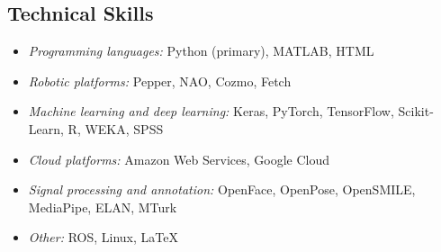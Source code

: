 \documentclass[11pt,letterpaper]{article}
\begin{document}
\subsection*{Technical Skills}
\begin{itemize}
  \item \emph{Programming languages:} Python (primary), MATLAB, HTML
  \item \emph{Robotic platforms:} Pepper, NAO, Cozmo, Fetch
  \item \emph{Machine learning and deep learning:} Keras, PyTorch, TensorFlow, Scikit-Learn, R, WEKA, SPSS
  \item \emph{Cloud platforms:} Amazon Web Services, Google Cloud
  \item \emph{Signal processing and annotation:} OpenFace, OpenPose, OpenSMILE, MediaPipe, ELAN, MTurk
  \item \emph{Other:} ROS, Linux, \LaTeX
\end{itemize}
\end{document}
